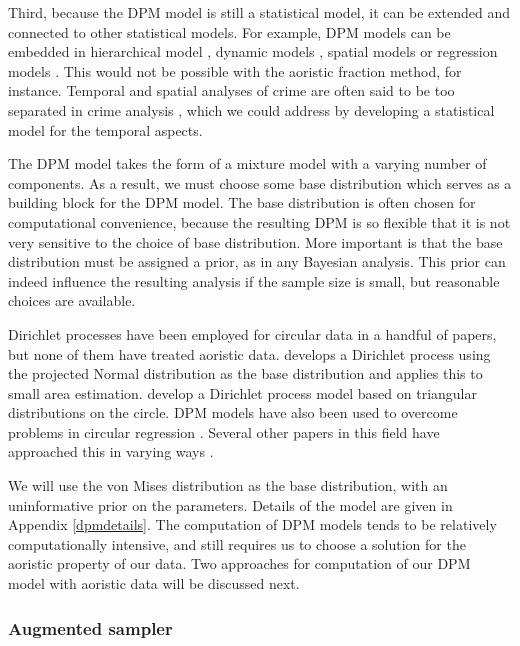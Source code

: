 Third, because the DPM model is still a statistical model, it can be extended and connected to other statistical models. For example, DPM models can be embedded in hierarchical model \citep{teh2005sharing}, dynamic models \citep{ren2008dynamic}, spatial models \citep{duan2007generalized} or regression models \citep{chib2010additive}. This would not be possible with the aoristic fraction method, for instance. Temporal and spatial analyses of crime are often said to be too separated in crime analysis \citep{grubesic2008spatio}, which we could address by developing a statistical model for the temporal aspects.

The DPM model takes the form of a mixture model with a varying number of components. As a result, we must choose some base distribution which serves as a building block for the DPM model. The base distribution is often chosen for computational convenience, because the resulting DPM is so flexible that it is not very sensitive to the choice of base distribution. More important is that the base distribution must be assigned a prior, as in any Bayesian analysis. This prior can indeed influence the resulting analysis if the sample size is small, but reasonable choices are available.

Dirichlet processes have been employed for circular data in a handful of papers, but none of them have treated aoristic data. \citet{hernandez2016hierarchical} develops a Dirichlet process using the projected Normal distribution as the base distribution and applies this to small area estimation. \citet{mcvinish2008semiparametric} develop a Dirichlet process model based on triangular distributions on the circle. DPM models have also been used to overcome problems in circular regression \citep{ghosh2003semiparametric, george2006semiparametric}. Several other papers in this field have approached this in varying ways \citep{nunez2015bayesian}.

We will use the von Mises distribution as the base distribution, with an uninformative prior on the parameters. Details of the model are given in Appendix \ref{dpmdetails}. The computation of DPM models tends to be relatively computationally intensive, and still requires us to choose a solution for the aoristic property of our data. Two approaches for computation of our DPM model with aoristic data will be discussed next.

\subsubsection{Augmented sampler}

